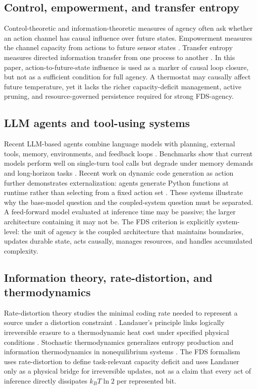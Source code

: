 \documentclass[10pt,a4paper,twocolumn,aps,prl]{revtex4-2}
\begin{document}
\subsection{Control, empowerment, and transfer entropy}

Control-theoretic and information-theoretic measures of agency often ask whether an action channel has causal influence over future states. Empowerment measures the channel capacity from actions to future sensor states \cite{klyubin2005empowerment}. Transfer entropy measures directed information transfer from one process to another \cite{schreiber2000measuring}. In this paper, action-to-future-state influence is used as a marker of causal loop closure, but not as a sufficient condition for full agency. A thermostat may causally affect future temperature, yet it lacks the richer capacity-deficit management, active pruning, and resource-governed persistence required for strong FDS-agency.

\subsection{LLM agents and tool-using systems}

Recent LLM-based agents combine language models with planning, external tools, memory, environments, and feedback loops \cite{yao2023react,wang2023survey,liu2023agentbench,wang2023voyager,patil2025bfcl}. Benchmarks show that current models perform well on single-turn tool calls but degrade under memory demands and long-horizon tasks \cite{patil2025bfcl}. Recent work on dynamic code generation as action further demonstrates externalization: agents generate Python functions at runtime rather than selecting from a fixed action set \cite{nguyen2025dynasaur}. These systems illustrate why the base-model question and the coupled-system question must be separated. A feed-forward model evaluated at inference time may be passive; the larger architecture containing it may not be. The FDS criterion is explicitly system-level: the unit of agency is the coupled architecture that maintains boundaries, updates durable state, acts causally, manages resources, and handles accumulated complexity.

\subsection{Information theory, rate-distortion, and thermodynamics}

Rate-distortion theory studies the minimal coding rate needed to represent a source under a distortion constraint \cite{shannon1959coding,berger1971rate,cover2006elements}. Landauer's principle links logically irreversible erasure to a thermodynamic heat cost under specified physical conditions \cite{landauer1961irreversibility,berut2012experimental}. Stochastic thermodynamics generalizes entropy production and information thermodynamics in nonequilibrium systems \cite{seifert2005entropy,parrondo2015thermodynamics,horowitz2015equivalent}. The FDS formalism uses rate-distortion to define task-relevant capacity deficit and uses Landauer only as a physical bridge for irreversible updates, not as a claim that every act of inference directly dissipates $k_B T\ln 2$ per represented bit.
\end{document}
